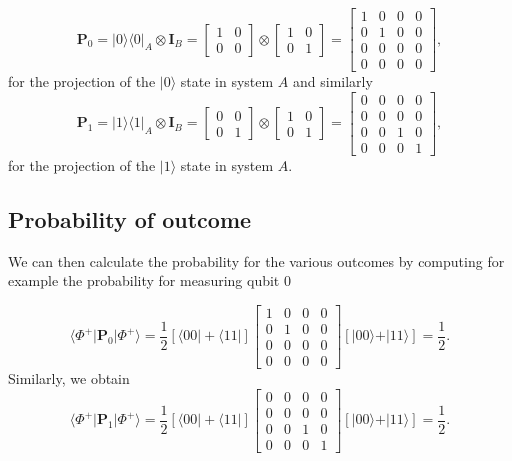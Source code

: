 \[
\bm{P}_0=\vert 0\rangle\langle 0\vert_A\otimes \bm{I}_B=\begin{bmatrix} 1 & 0\\ 0 & 0\end{bmatrix}\otimes\begin{bmatrix} 1& 0 \\ 0 & 1\end{bmatrix}=\begin{bmatrix} 1 & 0 & 0 & 0 \\ 0 & 1 & 0 & 0 \\ 0 & 0 & 0 & 0 \\ 0 & 0 & 0 & 0\end{bmatrix},
\]
for the projection of the $\vert 0 \rangle$ state in system $A$ and similarly
\[
\bm{P}_1=\vert 1\rangle\langle 1\vert_A\otimes \bm{I}_B=\begin{bmatrix} 0 & 0\\ 0 & 1\end{bmatrix}\otimes\begin{bmatrix} 1& 0 \\ 0 & 1\end{bmatrix}=\begin{bmatrix} 0 & 0 & 0 & 0 \\ 0 & 0 & 0 & 0 \\ 0 & 0 & 1 & 0 \\ 0 & 0 & 0 & 1\end{bmatrix},
\]
for the projection of the $\vert 1 \rangle$ state in system $A$.

\subsection{Probability of  outcome}

We can then calculate the probability for the various outcomes by
computing for example the probability for measuring qubit $0$ 

\[
\langle \Phi^+\vert \bm{P}_0\vert \Phi^+\rangle = \frac{1}{2} \left[\langle 00\vert +\langle 11\vert\right]\begin{bmatrix} 1 & 0 & 0 & 0 \\ 0 & 1 & 0 & 0 \\ 0 & 0 & 0 & 0 \\ 0 & 0 & 0 & 0\end{bmatrix}\left[\vert 00\rangle +\vert 11\rangle\right]=\frac{1}{2}.
\]
Similarly, we obtain
\[
\langle \Phi^+\vert \bm{P}_1\vert \Phi^+\rangle = \frac{1}{2}\left[\langle 00\vert +\langle 11\vert\right]\begin{bmatrix} 0 & 0 & 0 & 0 \\ 0 & 0 & 0 & 0 \\ 0 & 0 & 1 & 0 \\ 0 & 0 & 0 & 1\end{bmatrix}\left[\vert 00\rangle +\vert 11\rangle\right]=\frac{1}{2}.
\]

